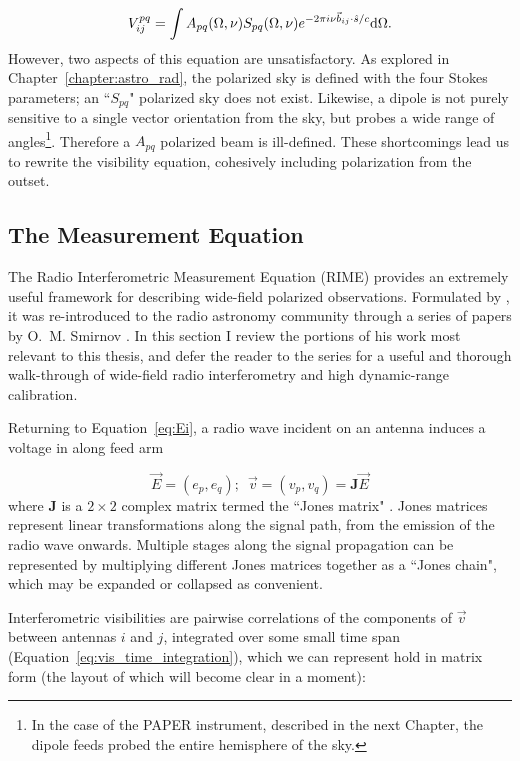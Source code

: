 \begin{equation}
V^{pq}_{ij} = \int A_{pq}(\Omega, \nu) S_{pq}(\Omega, \nu) e^{-2\pi i \nu \vec{b}_{ij}\cdot\hat{s}/c} {\rm d}\Omega.
\end{equation} 
However, two aspects of this equation are unsatisfactory. As explored in Chapter~\ref{chapter:astro_rad}, the polarized sky is defined with the four Stokes parameters; an ``$S_{pq}$" polarized sky does not exist. Likewise, a dipole is not purely sensitive to a single vector orientation from the sky, but probes a wide range of angles\footnote{In the case of the PAPER instrument, described in the next Chapter, the dipole feeds probed the entire hemisphere of the sky.}. Therefore a $A_{pq}$ polarized beam is ill-defined. These shortcomings lead us to rewrite the visibility equation, cohesively including polarization from the outset.  

\subsection{The Measurement Equation}

The Radio Interferometric Measurement Equation (RIME) provides an extremely useful framework for describing wide-field polarized observations. Formulated by \cite{HBS.1.96}, it was re-introduced to the radio astronomy community through a series of papers by O.~M. Smirnov \citep{Smirnov.11, Smirnov.11.2, Smirnov.11.3, Smirnov.11.4}. In this section I review the portions of his work most relevant to this thesis, and defer the reader to the series for a useful and thorough walk-through of wide-field radio interferometry and high dynamic-range calibration.

Returning to Equation~\ref{eq:Ei}, a radio wave incident on an antenna induces a voltage in along feed arm

\begin{equation}
\vec{E} = (e_p, e_q);\,\,\,\vec{v} = (v_p,v_q) = \textbf{J}\vec{E}
\label{eq:voltage_jones}
\end{equation}
where \textbf{J} is a $2\times2$ complex matrix termed the ``Jones matrix" \citep{Jones.41}. Jones matrices represent linear transformations along the signal path, from the emission of the radio wave onwards. Multiple stages along the signal propagation can be represented by multiplying different Jones matrices together as a ``Jones chain", which may be expanded or collapsed as convenient.

Interferometric visibilities are pairwise correlations of the components of $\vec{v}$ between antennas $i$ and $j$, integrated over some small time span (Equation~\ref{eq:vis_time_integration}), which we can represent hold in matrix form (the layout of which will become clear in a moment):

